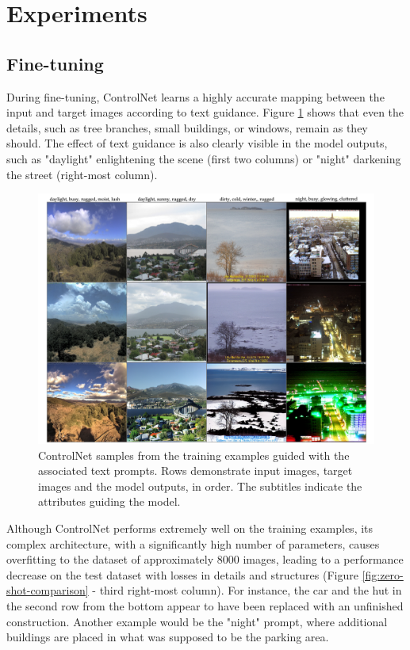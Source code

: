 \section{Experiments}\label{zero-shot-exp}

\subsection{Fine-tuning}
During fine-tuning, ControlNet learns a highly accurate mapping between the input and target images according to text guidance. Figure  \ref{fig:controlnet-train} shows that even the details, such as tree branches, small buildings, or windows, remain as they should. The effect of text guidance is also clearly visible in the model outputs, such as "daylight" enlightening the scene (first two columns) or "night" darkening the street (right-most column).
 
\begin{figure}[ht]
  \includegraphics[width=\textwidth]{Chapters/zero-shot-tat-figs/Controlnet2.png}
  \caption{ControlNet samples from the training examples guided with the associated text prompts. Rows demonstrate input images, target images and the model outputs, in order. The subtitles indicate the attributes guiding the model.}
  \label{fig:controlnet-train}
\end{figure}

Although ControlNet performs extremely well on the training examples, its complex architecture, with a significantly high number of parameters, causes overfitting to the dataset of approximately 8000 images, leading to a performance decrease on the test dataset with losses in details and structures (Figure \ref{fig:zero-shot-comparison} - third right-most column). For instance, the car and the hut in the second row from the bottom appear to have been replaced with an unfinished construction. Another example would be the "night" prompt, where additional buildings are placed in what was supposed to be the parking area.

